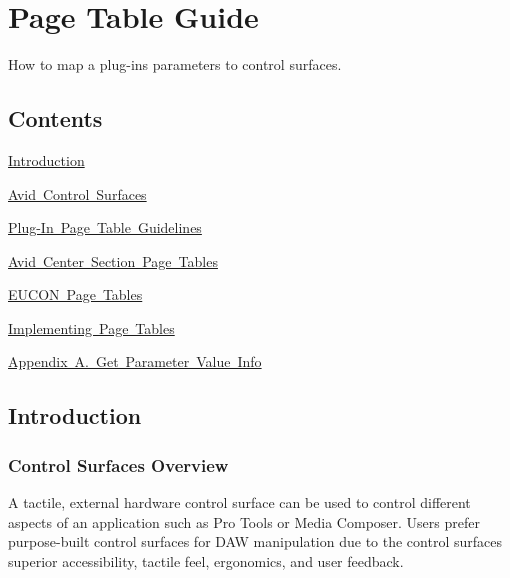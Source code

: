\hypertarget{a00833}{}\section{Page Table Guide}
\label{a00833}
How to map a plug-\/in\textquotesingle{}s parameters to control surfaces. 

\hypertarget{a00833_aax_page_table_guide_contents}{}\subsection{Contents}\label{a00833_aax_page_table_guide_contents}
\begin{DoxyItemize}
\item \mbox{\hyperlink{a00833_aax_page_table_guide_01_introduction}{Introduction}} \item \mbox{\hyperlink{a00833_aax_page_table_guide_02_avid_control_surfaces}{Avid Control Surfaces}} \item \mbox{\hyperlink{a00833_aax_page_table_guide_03_plug_in_page_table_guidelines}{Plug-\/\+In Page Table Guidelines}} \item \mbox{\hyperlink{a00833_aax_page_table_guide_04_avid_center_section_page_tables}{Avid Center Section Page Tables}} \item \mbox{\hyperlink{a00833_aax_page_table_guide__eucon_page_tables}{E\+U\+C\+ON Page Tables}} \item \mbox{\hyperlink{a00833_aax_page_table_guide_05_implementing_page_tables}{Implementing Page Tables}} \item \mbox{\hyperlink{a00833_aax_page_table_guide_a_get_parameter_value_info}{Appendix A. Get Parameter Value Info}}\end{DoxyItemize}
 \hypertarget{a00833_aax_page_table_guide_01_introduction}{}\subsection{Introduction}\label{a00833_aax_page_table_guide_01_introduction}
 \hypertarget{a00833_subsection__control_surfaces_overview}{}\subsubsection{Control Surfaces Overview}\label{a00833_subsection__control_surfaces_overview}
A tactile, external hardware control surface can be used to control different aspects of an application such as Pro Tools or Media Composer. Users prefer purpose-\/built control surfaces for D\+AW manipulation due to the control surface\textquotesingle{}s superior accessibility, tactile feel, ergonomics, and user feedback.

